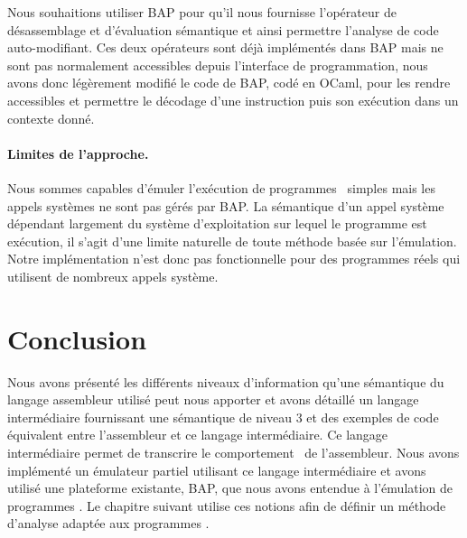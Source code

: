 Nous souhaitions utiliser BAP pour qu'il nous fournisse l'opérateur de désassemblage et d'évaluation sémantique et ainsi permettre l'analyse de code auto-modifiant.
Ces deux opérateurs sont déjà implémentés dans BAP mais ne sont pas normalement accessibles depuis l'interface de programmation, nous avons donc légèrement modifié le code de BAP, codé en OCaml, pour les rendre accessibles et permettre le décodage d'une instruction puis son exécution dans un contexte donné.

\paragraph{Limites de l'approche.}
Nous sommes capables d'émuler l'exécution de programmes \sms\ simples mais les appels systèmes ne sont pas gérés par BAP.
La sémantique d'un appel système dépendant largement du système d'exploitation sur lequel le programme est exécution, il s'agit d'une limite naturelle de toute méthode basée sur l'émulation.
Notre implémentation n'est donc pas fonctionnelle pour des programmes réels qui utilisent de nombreux appels système.

\section*{Conclusion}
Nous avons présenté les différents niveaux d'information qu'une sémantique du langage assembleur utilisé peut nous apporter et avons détaillé un langage intermédiaire fournissant une sémantique de niveau 3 et des exemples de code équivalent entre l'assembleur et ce langage intermédiaire.
Ce langage intermédiaire permet de transcrire le comportement \sm\ de l'assembleur.
Nous avons implémenté un émulateur partiel utilisant ce langage intermédiaire et avons utilisé une plateforme existante, BAP, que nous avons entendue à l'émulation de programmes \sms.
Le chapitre suivant utilise ces notions afin de définir un méthode d'analyse adaptée aux programmes \sms.